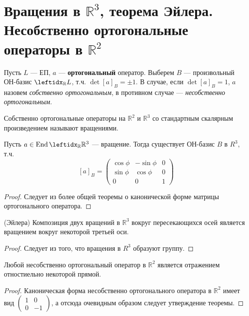 \section{Вращения в $\mathbb{R}^3$, теорема Эйлера. Несобственно ортогональные операторы в $\mathbb{R}^2$}

\begin{defn}
    Пусть $L$ --- ЕП, $a$ --- \textbf{ортогональный} оператор. Выберем $B$ --- произвольный ОН-базис $\lsub{\mathbb{R}}{L}$, т.ч. $\det [a]_B = \pm 1$. В случае, если $\det [a]_B = 1$, $a$ назовем \textit{собственно ортогональным}, в противном случае --- \textit{несобственно ортогональным}.
\end{defn}

\begin{defn}
    Собственно ортогональные операторы на $\mathbb{R}^2$ и $\mathbb{R}^3$ со стандартным скалярным произведением называют вращениями.
\end{defn}

\begin{thm}
    Пусть $a \in \End \lsub{\mathbb{R}}{\mathbb{R}^3}$ --- вращение. Тогда существует ОН-базис $B$ в $R^3$, т.ч. $$[a]_B = \begin{pmatrix}
        \cos \phi & -\sin \phi & 0 \\
        \sin \phi & \cos \phi  & 0 \\
        0         & 0          & 1
    \end{pmatrix}$$
\end{thm}

\begin{proof}
    Следует из более общей теоремы о канонической форме матрицы ортогонального оператора.
\end{proof}

\begin{thm}{(Эйлера)}
    Композиция двух вращений в $\mathbb{R}^3$ вокруг пересекающихся осей является вращением вокруг некоторой третьей оси.
\end{thm}

\begin{proof}
    Следует из того, что вращения в $R^3$ образуют группу.
\end{proof}

\begin{thm}
    Любой несобственно ортогональный оператор в $\mathbb{R}^2$ является отражением отностиельно некоторой прямой.
\end{thm}

\begin{proof}
    Каноническая форма несобственно ортогонального оператора в $\mathbb{R}^2$ имеет вид $\begin{pmatrix}
        1 & 0 \\
        0 & -1
    \end{pmatrix}$, а отсюда очевидным образом следует утверждение теоремы.
\end{proof}